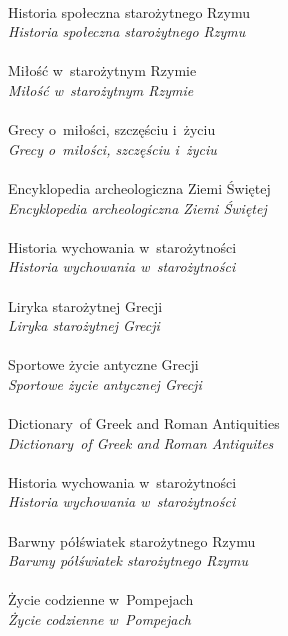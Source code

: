 \documentclass[a4paper,11pt]{article}
\begin{document}
 \\
\Jest  Historia społeczna starożytnego Rzymu \\
\Powin \textit{Historia społeczna starożytnego Rzymu} \\
 \\
\Jest  Miłość w~starożytnym Rzymie \\
\Powin \textit{Miłość w~starożytnym Rzymie} \\
 \\
\Jest  Grecy o~miłości, szczęściu i~życiu \\
\Powin \textit{Grecy o~miłości, szczęściu i~życiu} \\
 \\
\Jest  Encyklopedia archeologiczna Ziemi Świętej \\
\Powin \textit{Encyklopedia archeologiczna Ziemi Świętej} \\
 \\
\Jest  Historia wychowania w~starożytności \\
\Powin \textit{Historia wychowania w~starożytności} \\
 \\
\Jest  Liryka starożytnej Grecji \\
\Powin \textit{Liryka starożytnej Grecji} \\
 \\
\Jest  Sportowe życie antyczne Grecji \\
\Powin \textit{Sportowe życie antycznej Grecji} \\
 \\
\Jest  Dictionary~of Greek and Roman Antiquities \\
\Powin \textit{Dictionary~of Greek and Roman Antiquites} \\
 \\
\Jest  Historia wychowania w~starożytności \\
\Powin \textit{Historia wychowania w~starożytności} \\
 \\
\Jest  Barwny półświatek starożytnego Rzymu \\
\Powin \textit{Barwny półświatek starożytnego Rzymu} \\
 \\
\Jest  Życie codzienne w~Pompejach \\
\Powin \textit{Życie codzienne w~Pompejach} \\
\end{document}
